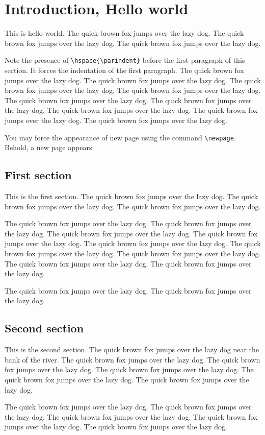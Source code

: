 \chapter{Introduction, Hello world}

\hspace{\parindent} This is hello
world\cite{Goodman,stein,AppliedOptics}. The quick brown fox jumps
over the lazy dog. The quick brown fox jumps over the lazy dog.
The quick brown fox jumps over the lazy dog.

Note the presence of \verb+\hspace{\parindent}+ before the first
paragraph of this section.  It forces the indentation of the first
paragraph. The quick brown fox jumps over the lazy dog. The quick
brown fox jumps over the lazy dog. The quick brown fox jumps over
the lazy dog. The quick brown fox jumps over the lazy dog. The
quick brown fox jumps over the lazy dog. The quick brown fox jumps
over the lazy dog. The quick brown fox jumps over the lazy dog.
The quick brown fox jumps over the lazy dog. The quick brown fox
jumps over the lazy dog.

You may force the appearance of new page using the command
\verb+\newpage+. \newpage Behold, a new page appears.

\section{First section}

\hspace{\parindent} This is the first section.  The quick brown
fox jumps over the lazy dog. The quick brown fox jumps over the
lazy dog. The quick brown fox jumps over the lazy dog.

The quick brown fox jumps over the lazy dog. The quick brown fox
jumps over the lazy dog. The quick brown fox jumps over the lazy
dog. The quick brown fox jumps over the lazy dog. The quick brown
fox jumps over the lazy dog. The quick brown fox jumps over the
lazy dog. The quick brown fox jumps over the lazy dog. The quick
brown fox jumps over the lazy dog. The quick brown fox jumps over
the lazy dog.

The quick brown fox jumps over the lazy dog. The quick brown fox
jumps over the lazy dog.

\section{Second section}
\hspace{\parindent} This is the second section. The quick brown
fox jumps over the lazy dog near the bank of the river. The quick
brown fox jumps over the lazy dog. The quick brown fox jumps over
the lazy dog. The quick brown fox jumps over the lazy dog. The
quick brown fox jumps over the lazy dog. The quick brown fox jumps
over the lazy dog. 

The quick brown fox jumps over the lazy dog. The quick brown fox
jumps over the lazy dog. The quick brown fox jumps over the lazy
dog. The quick brown fox jumps over the lazy dog. The quick brown
fox jumps over the lazy dog.

